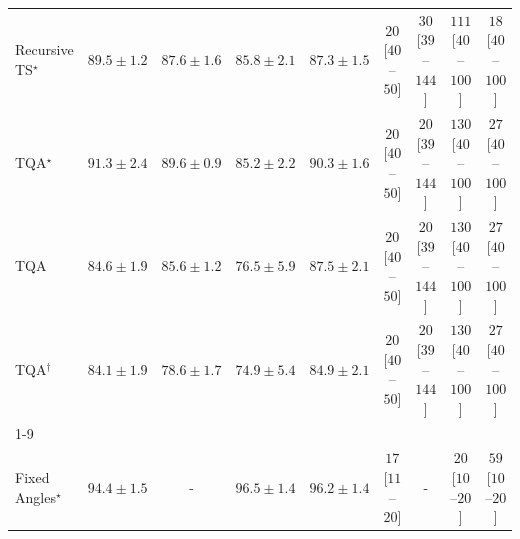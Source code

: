 \begin{tabular}{l|cccc|cccc|}
Recursive TS$^\star$ & {\cellcolor[HTML]{086E3A}} \color[HTML]{F1F1F1} $89.5\pm 1.2$ & {\cellcolor[HTML]{13773D}} \color[HTML]{F1F1F1} $87.6\pm 1.6$ & {\cellcolor[HTML]{1F8142}} \color[HTML]{F1F1F1} $85.8\pm 2.1$ & {\cellcolor[HTML]{15793E}} \color[HTML]{F1F1F1} $87.3\pm 1.5$ & {\cellcolor[HTML]{FFF4F0}} \color[HTML]{000000} $20$ [$40$--$50$] & {\cellcolor[HTML]{FFF2EE}} \color[HTML]{000000} $30$ [$39$--$144$] & {\cellcolor[HTML]{FDDEDB}} \color[HTML]{000000} $111$ [$40$--$100$] & {\cellcolor[HTML]{FFF5F1}} \color[HTML]{000000} $18$ [$40$--$100$] \\
TQA$^\star$ & {\cellcolor[HTML]{006536}} \color[HTML]{F1F1F1} $91.3\pm 2.4$ & {\cellcolor[HTML]{076D39}} \color[HTML]{F1F1F1} $89.6\pm 0.9$ & {\cellcolor[HTML]{228343}} \color[HTML]{F1F1F1} $85.2\pm 2.2$ & {\cellcolor[HTML]{026A38}} \color[HTML]{F1F1F1} $90.3\pm 1.6$ & {\cellcolor[HTML]{FFF4F0}} \color[HTML]{000000} $20$ [$40$--$50$] & {\cellcolor[HTML]{FFF4F0}} \color[HTML]{000000} $20$ [$39$--$144$] & {\cellcolor[HTML]{FDD9D6}} \color[HTML]{000000} $130$ [$40$--$100$] & {\cellcolor[HTML]{FFF3EF}} \color[HTML]{000000} $27$ [$40$--$100$] \\
TQA & {\cellcolor[HTML]{258745}} \color[HTML]{F1F1F1} $84.6\pm 1.9$ & {\cellcolor[HTML]{208242}} \color[HTML]{F1F1F1} $85.6\pm 1.2$ & {\cellcolor[HTML]{5DB96B}} \color[HTML]{F1F1F1} $76.5\pm 5.9$ & {\cellcolor[HTML]{14783E}} \color[HTML]{F1F1F1} $87.5\pm 2.1$ & {\cellcolor[HTML]{FFF4F0}} \color[HTML]{000000} $20$ [$40$--$50$] & {\cellcolor[HTML]{FFF4F0}} \color[HTML]{000000} $20$ [$39$--$144$] & {\cellcolor[HTML]{FDD9D6}} \color[HTML]{000000} $130$ [$40$--$100$] & {\cellcolor[HTML]{FFF3EF}} \color[HTML]{000000} $27$ [$40$--$100$] \\
TQA$^\dagger$ & {\cellcolor[HTML]{288A47}} \color[HTML]{F1F1F1} $84.1\pm 1.9$ & {\cellcolor[HTML]{49AF61}} \color[HTML]{F1F1F1} $78.6\pm 1.7$ & {\cellcolor[HTML]{6DC073}} \color[HTML]{000000} $74.9\pm 5.4$ & {\cellcolor[HTML]{248644}} \color[HTML]{F1F1F1} $84.9\pm 2.1$ & {\cellcolor[HTML]{FFF4F0}} \color[HTML]{000000} $20$ [$40$--$50$] & {\cellcolor[HTML]{FFF4F0}} \color[HTML]{000000} $20$ [$39$--$144$] & {\cellcolor[HTML]{FDD9D6}} \color[HTML]{000000} $130$ [$40$--$100$] & {\cellcolor[HTML]{FFF3EF}} \color[HTML]{000000} $27$ [$40$--$100$] \\
\cline{1-9}
\multicolumn{9}{c}{\rule{0pt}{8pt}SV} \\
\midrule
Fixed Angles$^\star$ & {\cellcolor[HTML]{03446A}} \color[HTML]{F1F1F1} $94.4\pm 1.5$ & {\cellcolor[HTML]{000000}} \color[HTML]{F1F1F1} {\cellcolor{white}} \color{black} - & {\cellcolor[HTML]{023858}} \color[HTML]{F1F1F1} $96.5\pm 1.4$ & {\cellcolor[HTML]{02395A}} \color[HTML]{F1F1F1} $96.2\pm 1.4$ & {\cellcolor[HTML]{FFF5F1}} \color[HTML]{000000} $17$ [$11$--$20$] & {\cellcolor[HTML]{000000}} \color[HTML]{F1F1F1} {\cellcolor{white}} \color{black} - & {\cellcolor[HTML]{FFF4F0}} \color[HTML]{000000} $20$ [$10$--$20$] & {\cellcolor[HTML]{FEEBE7}} \color[HTML]{000000} $59$ [$10$--$20$] \\

\end{tabular}
